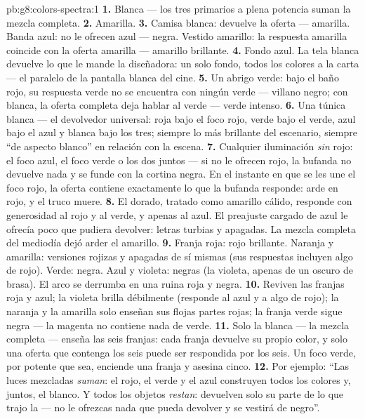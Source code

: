 \begin{solution}{pb:g8:colors-spectra:1}
\textbf{1.} Blanca --- los tres primarios a plena potencia suman la
mezcla completa.
\textbf{2.} Amarilla.
\textbf{3.} Camisa blanca: devuelve la oferta --- amarilla. Banda azul:
no le ofrecen azul --- negra. Vestido amarillo: la respuesta amarilla
coincide con la oferta amarilla --- amarillo brillante.
\textbf{4.} Fondo azul. La tela blanca devuelve lo que le mande la
diseñadora: un solo fondo, todos los colores a la carta --- el paralelo
de la pantalla blanca del cine.
\textbf{5.} Un abrigo verde: bajo el baño rojo, su respuesta verde no
se encuentra con ningún verde --- villano negro; con  blanca,
la oferta completa deja hablar al verde --- verde intenso.
\textbf{6.} Una túnica blanca --- el devolvedor universal: roja bajo el
foco rojo, verde bajo el verde, azul bajo el azul y blanca bajo los
tres; siempre lo más brillante del escenario, siempre ``de aspecto
blanco'' en relación con la escena.
\textbf{7.} Cualquier iluminación \emph{sin} rojo: el foco azul, el
foco verde o los dos juntos --- si no le ofrecen rojo, la bufanda no
devuelve nada y se funde con la cortina negra. En el instante en
que se les une el foco rojo, la oferta contiene exactamente lo que la
bufanda responde: arde en rojo, y el truco muere.
\textbf{8.} El dorado, tratado como amarillo cálido, responde con
generosidad al rojo y al verde, y apenas al azul. El preajuste cargado
de azul le ofrecía poco que pudiera devolver: letras turbias y
apagadas. La mezcla completa del mediodía dejó arder el amarillo.
\textbf{9.} Franja roja: rojo brillante. Naranja y amarilla: versiones
rojizas y apagadas de sí mismas (sus respuestas incluyen algo de rojo).
Verde: negra. Azul y violeta: negras (la violeta, apenas de un oscuro
de brasa). El arco se derrumba en una ruina roja y negra.
\textbf{10.} Reviven las franjas roja y azul; la violeta brilla
débilmente (responde al azul y a algo de rojo); la naranja y la
amarilla solo enseñan sus flojas partes rojas; la franja verde sigue
negra --- la  magenta no contiene nada de verde.
\textbf{11.} Solo la  blanca --- la mezcla completa --- enseña
las seis franjas: cada franja devuelve su propio color, y solo una
oferta que contenga los seis puede ser respondida por los seis. Un foco
verde, por potente que sea, enciende una franja y asesina cinco.
\textbf{12.} Por ejemplo: ``Las luces mezcladas \emph{suman}: el
rojo, el verde y el azul construyen todos los colores y, juntos, el
blanco. Y todos los objetos \emph{restan}: devuelven solo su parte de
lo que trajo la  --- no le ofrezcas nada que pueda devolver y
se vestirá de negro''.
\end{solution}
